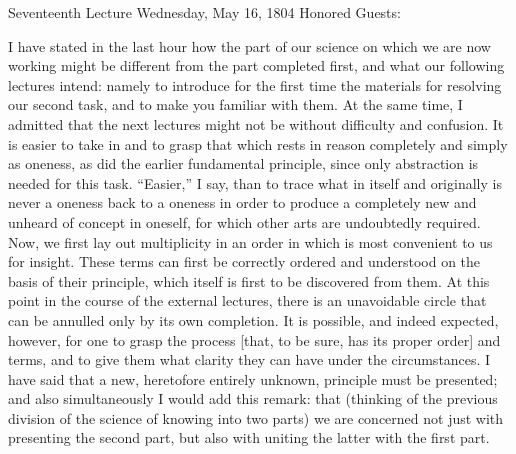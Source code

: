 Seventeenth Lecture
Wednesday, May 16, 1804
Honored Guests:

I have stated in the last hour how
the part of our science on which we are now working
might be different from the part completed first,
and what our following lectures intend:
namely to introduce for the first time
the materials for resolving our second task,
and to make you familiar with them.
At the same time, I admitted that the next lectures
might not be without difficulty and confusion.
It is easier to take in and to grasp
that which rests in reason completely and simply as oneness,
as did the earlier fundamental principle,
since only abstraction is needed for this task.
“Easier,” I say, than to trace what
in itself and originally is never a oneness
back to a oneness in order to produce
a completely new and unheard of concept in oneself,
for which other arts are undoubtedly required.
Now, we first lay out multiplicity in an order
in which is most convenient to us for insight.
These terms can first be correctly
ordered and understood on the basis of their principle,
which itself is first to be discovered from them.
At this point in the course of the external lectures,
there is an unavoidable circle that can be annulled
only by its own completion.
It is possible, and indeed expected, however,
for one to grasp the process
[that, to be sure, has its proper order]
and terms, and to give them what clarity
they can have under the circumstances.
I have said that a new, heretofore entirely unknown,
principle must be presented;
and also simultaneously I would add this remark: that
(thinking of the previous division
of the science of knowing into two parts)
we are concerned not just with presenting the second part,
but also with uniting the latter with the first part.


